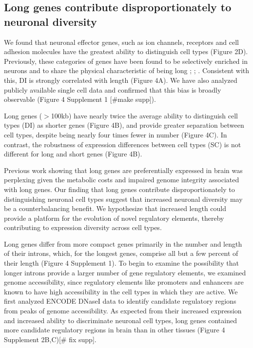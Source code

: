 \subsection{Long genes contribute disproportionately to neuronal diversity}

We found that neuronal effector genes, such as ion channels, receptors and cell adhesion molecules have the greatest ability to distinguish cell types (Figure 2D). Previously, these categories of genes have been found to be selectively enriched in neurons and to share the physical characteristic of being long \cite{Sugino_2014}; \cite{Gabel_2015}; \cite{Zylka_2015}. Consistent with this, DI is strongly correlated with length (Figure 4A). We have also analyzed publicly available single cell data and confirmed that this bias is broadly observable (Figure 4 Supplement 1 [#make supp]). 

Long genes ($\gt$100kb) have nearly twice the average ability to distinguish cell types (DI) as shorter genes (Figure 4B), and provide greater separation between cell types, despite being nearly four times fewer in number (Figure 4C). In contrast, the robustness of expression differences between cell types (SC) is not different for long and short genes (Figure 4B).  

Previous work showing that long genes are preferentially expressed in brain was perplexing given the metabolic costs \cite{Castillo_Davis_2002} and impaired genome integrity \cite{Wei_2016} associated with long genes. Our finding that long genes contribute disproportionately to distinguishing neuronal cell types suggest that increased neuronal diversity may be a counterbalancing benefit. We hypothesize that increased length could provide a platform for the evolution of novel regulatory elements, thereby contributing to expression diversity across cell types.

Long genes differ from more compact genes primarily in the number and length of their introns, which, for the longest genes, comprise all but a few percent of their length (Figure 4 Supplement 1). To begin to examine the possibility that longer introns provide a larger number of gene regulatory elements, we examined genome accessibility, since regulatory elements like promoters and enhancers are known to have high accessibility in the cell types in which they are active. We first analyzed ENCODE DNaseI data to identify candidate regulatory regions from peaks of genome accessibility. As expected from their increased expression and increased ability to discriminate neuronal cell types, long genes contained more candidate regulatory regions in brain than in other tissues (Figure 4 Supplement 2B,C)[# fix supp]. 

